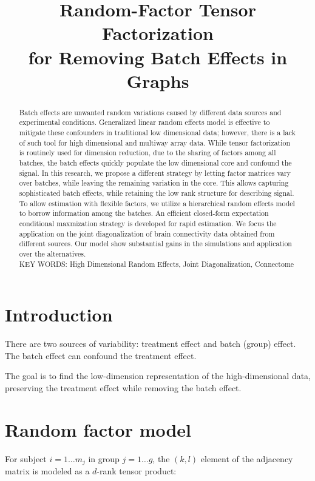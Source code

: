 \documentclass[12pt]{article}
\title
    {Random-Factor Tensor Factorization \\for Removing Batch Effects in Graphs}
\date{}
\begin{document}
    
\maketitle

\begin{abstract}
Batch effects are unwanted random variations caused by different data sources and experimental conditions. Generalized linear random effects model is effective to mitigate these confounders in traditional low dimensional data; however, there is a lack of such tool for high dimensional and multiway array data. While tensor factorization is routinely used for dimension reduction, due to the sharing of factors among all batches, the batch effects quickly populate the low dimensional core and confound the signal. In this research, we propose a different strategy by letting factor matrices vary over batches, while leaving the remaining variation in the core. This allows capturing sophisticated batch effects, while retaining the low rank structure for describing signal. To allow estimation with flexible factors, we utilize a hierarchical random effects model to borrow information among the batches. An efficient closed-form expectation conditional maxmization strategy is developed for rapid estimation. We focus the application on the joint diagonalization of brain connectivity data obtained from different sources. Our model show substantial gains in the simulations and application over the alternatives.\\
{\noindent  KEY WORDS:  High Dimensional Random Effects, Joint Diagonalization, Connectome}
\end{abstract}

\section{Introduction}

There are two sources of variability: treatment effect and batch (group) effect. The batch effect can confound the treatment effect.

The goal is to find the low-dimension representation of the high-dimensional data, preserving the treatment effect while removing the batch effect. 

\section{Random factor model}

For subject $i = 1 \ldots m_j$ in group $j = 1 \ldots g$, the $(k,l)$ element of the adjacency matrix is modeled as a $d$-rank tensor product:
\end{document}
